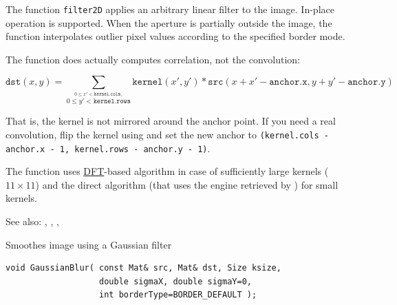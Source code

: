 The function \texttt{filter2D} applies an arbitrary linear filter to the image. In-place operation is supported. When the aperture is partially outside the image, the function interpolates outlier pixel values according to the specified border mode.

The function does actually computes correlation, not the convolution:

\[
\texttt{dst}(x,y) = \sum_{\stackrel{0\leq x' < \texttt{kernel.cols},}{0\leq y' < \texttt{kernel.rows}}} \texttt{kernel}(x',y')*\texttt{src}(x+x'-\texttt{anchor.x},y+y'-\texttt{anchor.y})
\]

That is, the kernel is not mirrored around the anchor point. If you need a real convolution, flip the kernel using  and set the new anchor to \texttt{(kernel.cols - anchor.x - 1, kernel.rows - anchor.y - 1)}.

The function uses \hyperref[dft]{DFT}-based algorithm in case of sufficiently large kernels (~$11\times11$) and the direct algorithm (that uses the engine retrieved by ) for small kernels.

See also: , , , 

\label{GaussianBlur}
Smoothes image using a Gaussian filter

\begin{lstlisting}
void GaussianBlur( const Mat& src, Mat& dst, Size ksize,
                   double sigmaX, double sigmaY=0,
                   int borderType=BORDER_DEFAULT );
\end{lstlisting}
\begin{description}
\end{description}


